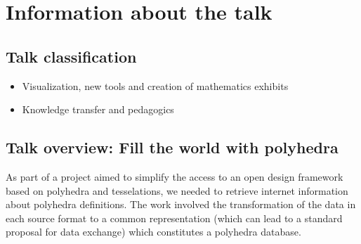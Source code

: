 \documentclass[a4paper,10pt]{article}
\begin{document}
     

\section{Information about the talk}

\subsection{Talk classification}

\begin{itemize}
\item Visualization, new tools and creation of mathematics exhibits
\item Knowledge transfer and pedagogics 
\end{itemize}

\subsection{Talk overview: Fill the world with polyhedra}






As part of a project aimed to simplify the access to an open design framework based on polyhedra and tesselations, we needed to retrieve internet information about polyhedra definitions. The work involved the transformation of the data in each source format to a common representation (which can lead to a standard proposal for data exchange) which constitutes a polyhedra database.  
\end{document}
